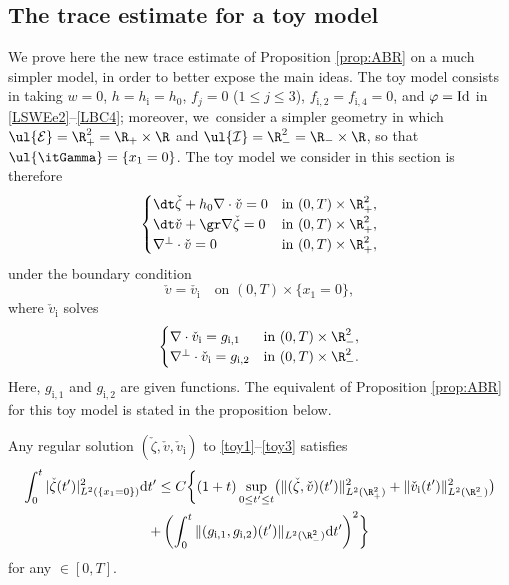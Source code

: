 \subsection{The trace estimate for a toy model}
We prove here the new trace estimate of Proposition \ref{prop:ABR} on a much simpler model, in order to better expose the main ideas.
The toy model consists in taking $w=0$, $h=h_\mathrm{i}=h_0$, $f_j=0$ ($1\leq j\leq 3$), $f_\mathrm{i,2}=f_\mathrm{i,4}=0$,
and $\varphi={\rm Id}$ in \eqref{LSWEe2}--\eqref{LBC4};
moreover, we~consider a simpler geometry in which $\ul{\mathcal E}=\R^2_+=\R_+\times \R$ and $\ul{\mathcal I}=\R^2_-=\R_-\times \R$,
so that $\ul{\itGamma}=\{x_1=0\}$.
The toy model we consider in this section is therefore
\begin{equation}\label{toy1}
\begin{cases}
\dt \check{\zeta}+h_0\nabla\cdot \check{v}=0 &\text{in } (0,T)\times \R^2_+, \\
\dt \check{v}+\gr \nabla \check{\zeta}=0 &\text{in } (0,T)\times \R^2_+, \\
\nabla^\perp\cdot\check{v}=0 &\text{in } (0,T)\times \R^2_+,
\end{cases}
\end{equation}
under the boundary condition
\begin{equation}\label{toy2}
\check{v}=\check{v_\mathrm{i}} \quad\text{on } (0,T)\times \{x_1=0\},
\end{equation}
where $\check{v}_\mathrm{i}$ solves
\begin{equation}\label{toy3}
\begin{cases}
\nabla\cdot \check{v}_\mathrm{i}=g_\mathrm{i,1} &\text{in } (0,T)\times \R^2_-, \\
\nabla^\perp\cdot \check{v}_\mathrm{i}=g_\mathrm{i,2} &\text{in } (0,T)\times \R^2_-.
\end{cases}
\end{equation}
Here, $g_\mathrm{i,1} $ and $g_\mathrm{i,2} $ are given functions.
The equivalent of Proposition \ref{prop:ABR} for this toy model is stated in the proposition below.

\begin{proposition}\label{prop:ABRtoy}
Any regular solution $(\check{\zeta},\check{v}, \check{v}_\mathrm{i})$ to \eqref{toy1}--\eqref{toy3} satisfies
\begin{multline*}
\int_0^t|\check{\zeta}(t')|_{L^2(\{x_1=0\})}^2\mathrm{d}t'
\leq C \biggl\{ (1+t)\sup_{0\leq t'\leq t}\bigl(\|(\check{\zeta},\check{v})(t')\|_{L^2({\R^2_+})}^2
+ \|\check{v}_\mathrm{i}(t')\|_{L^2(\R^2_-)}^2 \bigr) \\
+ \left(\int_0^t
\|(g_{{\rm i},1},g_{{\rm i},2})(t')\|_{L^2(\R^2_-)} {\rm d}t' \right)^2 \biggr\}
\end{multline*}
for any $\in[0,T]$.
\end{proposition}

